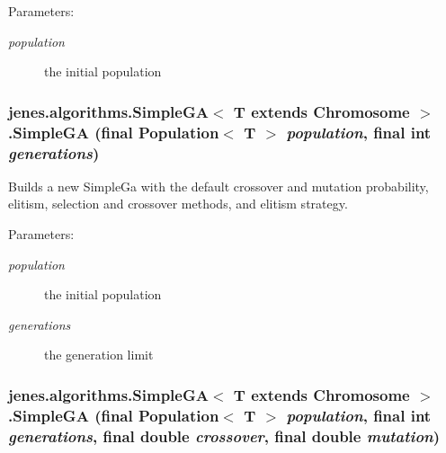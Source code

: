 \begin{Desc}
\item[Parameters:]
\begin{description}
\item[{\em population}]the initial population \end{description}
\end{Desc}
\hypertarget{classjenes_1_1algorithms_1_1_simple_g_a_3_01_t_01extends_01_chromosome_01_4_c26dcb81ef937ded77152a908ac55699}{
\subsubsection[SimpleGA]{\setlength{\rightskip}{0pt plus 5cm}jenes.algorithms.SimpleGA$<$ T extends Chromosome $>$.SimpleGA (final Population$<$ T $>$ {\em population}, \/  final int {\em generations})}}
\label{classjenes_1_1algorithms_1_1_simple_g_a_3_01_t_01extends_01_chromosome_01_4_c26dcb81ef937ded77152a908ac55699}


Builds a new SimpleGa with the default crossover and mutation probability, elitism, selection and crossover methods, and elitism strategy. 

\begin{Desc}
\item[Parameters:]
\begin{description}
\item[{\em population}]the initial population \item[{\em generations}]the generation limit \end{description}
\end{Desc}
\hypertarget{classjenes_1_1algorithms_1_1_simple_g_a_3_01_t_01extends_01_chromosome_01_4_d6c74ec603e7fbc1610f41ad9ee63981}{
\subsubsection[SimpleGA]{\setlength{\rightskip}{0pt plus 5cm}jenes.algorithms.SimpleGA$<$ T extends Chromosome $>$.SimpleGA (final Population$<$ T $>$ {\em population}, \/  final int {\em generations}, \/  final double {\em crossover}, \/  final double {\em mutation})}}
\label{classjenes_1_1algorithms_1_1_simple_g_a_3_01_t_01extends_01_chromosome_01_4_d6c74ec603e7fbc1610f41ad9ee63981}


